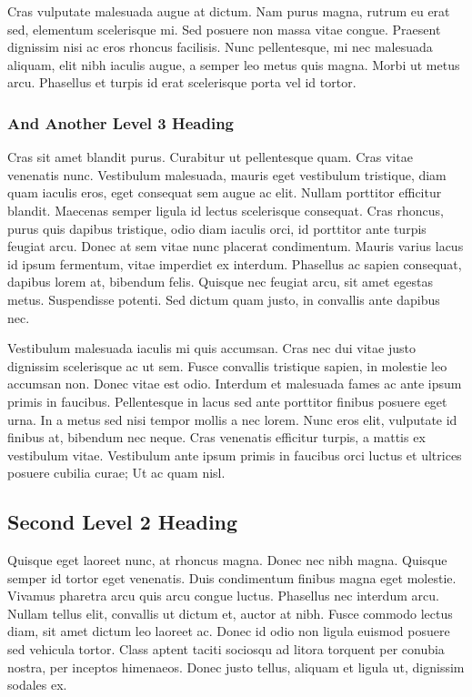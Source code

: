 Cras vulputate malesuada augue at dictum. Nam purus magna, rutrum eu erat sed, elementum scelerisque mi. Sed posuere non massa vitae congue. Praesent dignissim nisi ac eros rhoncus facilisis. Nunc pellentesque, mi nec malesuada aliquam, elit nibh iaculis augue, a semper leo metus quis magna. Morbi ut metus arcu. Phasellus et turpis id erat scelerisque porta vel id tortor.

\subsubsection{And Another Level 3 Heading}

Cras sit amet blandit purus. Curabitur ut pellentesque quam. Cras vitae venenatis nunc. Vestibulum malesuada, mauris eget vestibulum tristique, diam quam iaculis eros, eget consequat sem augue ac elit. Nullam porttitor efficitur blandit. Maecenas semper ligula id lectus scelerisque consequat. Cras rhoncus, purus quis dapibus tristique, odio diam iaculis orci, id porttitor ante turpis feugiat arcu. Donec at sem vitae nunc placerat condimentum. Mauris varius lacus id ipsum fermentum, vitae imperdiet ex interdum. Phasellus ac sapien consequat, dapibus lorem at, bibendum felis. Quisque nec feugiat arcu, sit amet egestas metus. Suspendisse potenti. Sed dictum quam justo, in convallis ante dapibus nec.

Vestibulum malesuada iaculis mi quis accumsan. Cras nec dui vitae justo dignissim scelerisque ac ut sem. Fusce convallis tristique sapien, in molestie leo accumsan non. Donec vitae est odio. Interdum et malesuada fames ac ante ipsum primis in faucibus. Pellentesque in lacus sed ante porttitor finibus posuere eget urna. In a metus sed nisi tempor mollis a nec lorem. Nunc eros elit, vulputate id finibus at, bibendum nec neque. Cras venenatis efficitur turpis, a mattis ex vestibulum vitae. Vestibulum ante ipsum primis in faucibus orci luctus et ultrices posuere cubilia curae; Ut ac quam nisl.

\subsection{Second Level 2 Heading}

Quisque eget laoreet nunc, at rhoncus magna. Donec nec nibh magna. Quisque semper id tortor eget venenatis. Duis condimentum finibus magna eget molestie. Vivamus pharetra arcu quis arcu congue luctus. Phasellus nec interdum arcu. Nullam tellus elit, convallis ut dictum et, auctor at nibh. Fusce commodo lectus diam, sit amet dictum leo laoreet ac. Donec id odio non ligula euismod posuere sed vehicula tortor. Class aptent taciti sociosqu ad litora torquent per conubia nostra, per inceptos himenaeos. Donec justo tellus, aliquam et ligula ut, dignissim sodales ex.

